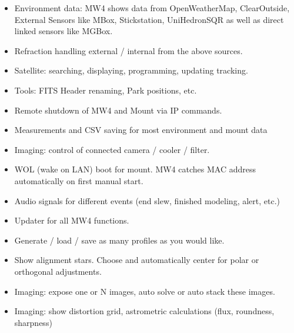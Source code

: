 \documentclass[a4paper,10pt,english]{sphinxmanual}
\begin{document}
\begin{itemize}
\item {} 
\sphinxAtStartPar
Environment data: MW4 shows data from OpenWeatherMap, ClearOutside, External
Sensors like MBox, Stickstation, UniHedronSQR as well as direct linked sensors
like MGBox.

\item {} 
\sphinxAtStartPar
Refraction handling external / internal from the above sources.

\item {} 
\sphinxAtStartPar
Satellite: searching, displaying, programming, updating tracking.

\item {} 
\sphinxAtStartPar
Tools: FITS Header renaming, Park positions, etc.

\item {} 
\sphinxAtStartPar
Remote shutdown of MW4 and Mount via IP commands.

\item {} 
\sphinxAtStartPar
Measurements and CSV saving for most environment and mount data

\item {} 
\sphinxAtStartPar
Imaging: control of connected camera / cooler / filter.

\item {} 
\sphinxAtStartPar
WOL (wake on LAN) boot for mount. MW4 catches MAC address automatically on
first manual start.

\item {} 
\sphinxAtStartPar
Audio signals for different events (end slew, finished modeling, alert, etc.)

\item {} 
\sphinxAtStartPar
Updater for all MW4 functions.

\item {} 
\sphinxAtStartPar
Generate / load / save as many profiles as you would like.

\item {} 
\sphinxAtStartPar
Show alignment stars. Choose and automatically center for polar or orthogonal
adjustments.

\item {} 
\sphinxAtStartPar
Imaging: expose one or N images, auto solve or auto stack these images.

\item {} 
\sphinxAtStartPar
Imaging: show distortion grid, astrometric calculations (flux, roundness,
sharpness)

\end{itemize}
\end{document}
